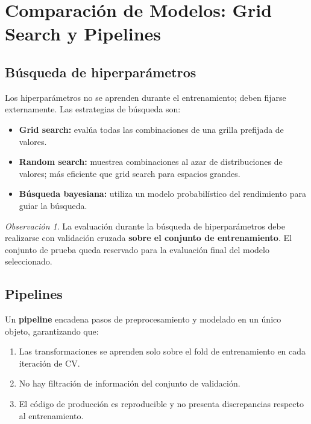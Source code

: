 \documentclass[12pt, a4paper]{article}
\theoremstyle{definition}
\theoremstyle{plain}
\theoremstyle{remark}
\newtheorem{observacion}{Observación}[section]
\begin{document}
\section{Comparación de Modelos: Grid Search y Pipelines}

\subsection{Búsqueda de hiperparámetros}

Los hiperparámetros no se aprenden durante el entrenamiento; deben fijarse externamente. Las estrategias de búsqueda son:

\begin{itemize}
  \item \textbf{Grid search:} evalúa todas las combinaciones de una grilla prefijada de valores.
  \item \textbf{Random search:} muestrea combinaciones al azar de distribuciones de valores; más eficiente que grid search para espacios grandes.
  \item \textbf{Búsqueda bayesiana:} utiliza un modelo probabilístico del rendimiento para guiar la búsqueda.
\end{itemize}

\begin{observacion}
  La evaluación durante la búsqueda de hiperparámetros debe realizarse con validación cruzada \textbf{sobre el conjunto de entrenamiento}. El conjunto de prueba queda reservado para la evaluación final del modelo seleccionado.
\end{observacion}

\subsection{Pipelines}

Un \textbf{pipeline} encadena pasos de preprocesamiento y modelado en un único objeto, garantizando que:
\begin{enumerate}
  \item Las transformaciones se aprenden solo sobre el fold de entrenamiento en cada iteración de CV.
  \item No hay filtración de información del conjunto de validación.
  \item El código de producción es reproducible y no presenta discrepancias respecto al entrenamiento.
\end{enumerate}
\end{document}
